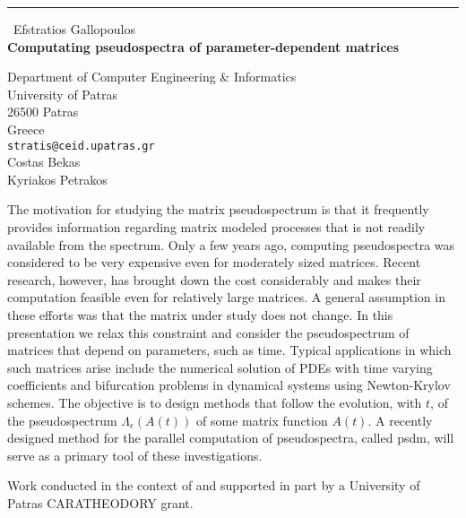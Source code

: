 \documentclass{report}
\begin{document}
\begin{center}
\rule{6in}{1pt} \
{\large Efstratios Gallopoulos \\
{\bf Computating pseudospectra of parameter-dependent matrices}}

Department of Computer Engineering & Informatics \\ University of Patras \\ 26500 Patras \\ Greece
\\
{\tt stratis@ceid.upatras.gr}\\
Costas Bekas\\
Kyriakos Petrakos\end{center}

The motivation for studying the matrix pseudospectrum is that it
frequently provides information regarding matrix modeled processes
that is not readily available from the spectrum. Only a few years
ago, computing pseudospectra was considered to be very expensive
even for moderately sized matrices. Recent research, however, has
brought down the cost considerably and makes their computation
feasible even for relatively large matrices. A general assumption
in these efforts was that the matrix under study does not change.
In this presentation we relax this constraint and consider the
pseudospectrum of matrices that depend on parameters, such as
time. Typical applications in which such matrices arise include
the numerical solution of PDEs with time varying coefficients and
bifurcation problems in dynamical systems using Newton-Krylov
schemes. The objective is to design methods that follow the
evolution, with $t$, of the pseudospectrum
$\Lambda_\epsilon(A(t))$ of some matrix function $A(t)$. A
recently designed method for the parallel computation of
pseudospectra, called {\sc psdm}, will serve as a primary tool
of these investigations.

Work conducted in the context of and supported in part by a
University of Patras CARATHEODORY grant.
\end{document}
